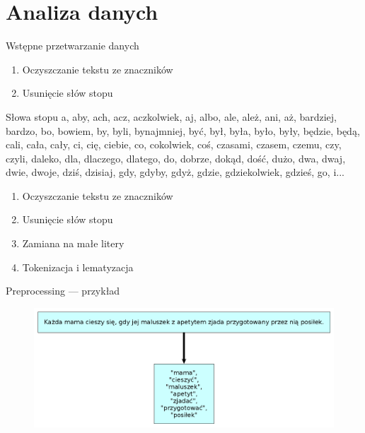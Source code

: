 \documentclass{beamer}
\begin{document}
	\section{Analiza danych}
	\begin{frame}{Wstępne przetwarzanie danych}
		\begin{enumerate}
			\item Oczyszczanie tekstu ze znaczników
			\item Usunięcie słów stopu
		\end{enumerate}
	\end{frame}
	\begin{frame}{Słowa stopu}
		a, aby, ach, acz, aczkolwiek, aj, albo, ale, ależ, ani, aż, bardziej, bardzo, bo, bowiem, by, byli, bynajmniej, być, był, była, było, były, będzie, będą, cali, cała, cały, ci, cię, ciebie, co, cokolwiek, coś, czasami, czasem, czemu, czy, czyli, daleko, dla, dlaczego, dlatego, do, dobrze, dokąd, dość, dużo, dwa, dwaj, dwie, dwoje, dziś, dzisiaj, gdy, gdyby, gdyż, gdzie, gdziekolwiek, gdzieś, go, i...
	\end{frame}
	\begin{frame}
		\begin{enumerate}
			\item Oczyszczanie tekstu ze znaczników
			\item Usunięcie słów stopu
			\item Zamiana na małe litery
			\item Tokenizacja i lematyzacja %
		\end{enumerate}
	\end{frame}
	\begin{frame}{Preprocessing --- przykład}
		\begin{figure}
			\centering
			\includegraphics[width=1\textwidth]{img/lemmatisation.png}
		\end{figure}
	\end{frame}
\end{document}
